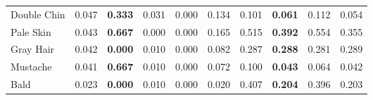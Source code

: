 \begin{tabular}{lrllrrllrr}
 Double Chin         & 0.047 & \bf 0.333 & 0.031     & 0.000 & 0.134 & 0.101     & \bf 0.061 & 0.112 & 0.054 \\
 Pale Skin           & 0.043 & \bf 0.667 & 0.000     & 0.000 & 0.165 & 0.515     & \bf 0.392 & 0.554 & 0.355 \\
 Gray Hair           & 0.042 & \bf 0.000 & 0.010     & 0.000 & 0.082 & 0.287     & \bf 0.288 & 0.281 & 0.289 \\
 Mustache            & 0.041 & \bf 0.667 & 0.010     & 0.000 & 0.072 & 0.100     & \bf 0.043 & 0.064 & 0.042 \\
 Bald                & 0.023 & \bf 0.000 & 0.010     & 0.000 & 0.020 & 0.407     & \bf 0.204 & 0.396 & 0.203 \\
\hline
\end{tabular}